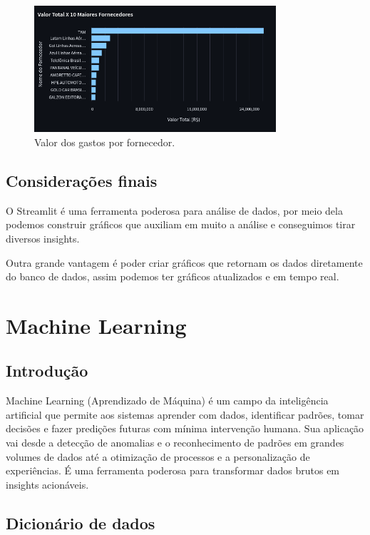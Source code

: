 \documentclass[12pt, a4paper]{article}
\begin{document}
\begin{figure}[!htbp]
	\centering
	\includegraphics[width=0.8\textwidth]{assets/2_plot4.png}
	\caption{Valor dos gastos por fornecedor.}
	\label{fig:criacao_postgresql}
\end{figure}


\subsection{Considerações finais}

O Streamlit é uma ferramenta poderosa para análise de dados, por meio dela podemos construir gráficos que auxiliam em muito a análise e conseguimos tirar diversos insights.

Outra grande vantagem é poder criar gráficos que retornam os dados diretamente do banco de dados, assim podemos ter gráficos atualizados e em tempo real.

\section{Machine Learning}
\subsection{Introdução}

Machine Learning (Aprendizado de Máquina) é um campo da inteligência artificial que permite aos sistemas aprender com dados, identificar padrões, tomar decisões e fazer predições futuras com mínima intervenção humana. Sua aplicação vai desde a detecção de anomalias e o reconhecimento de padrões em grandes volumes de dados até a otimização de processos e a personalização de experiências. É uma ferramenta poderosa para transformar dados brutos em insights acionáveis.

\subsection{Dicionário de dados}
\end{document}
